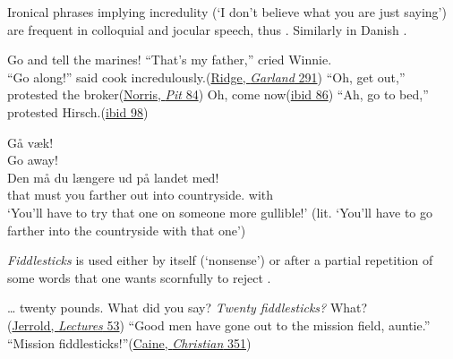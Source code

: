  \label{sec:ironic-incredulity}

Ironical phrases implying incredulity (`I don't believe what you are just saying') are frequent in colloquial and jocular speech, thus . Similarly in Danish .

\ea \label{ex:04-131}
\ea
Go and tell the marines!
\ex
``That's my father,'' cried Winnie.\\``Go along!'' said cook incredulously.\hfill(\href{https://babel.hathitrust.org/cgi/pt?id=nyp.33433081588182&seq=304&q1=said+cook+incredulously}{Ridge, \textit{Garland} 291}) %
\ex
``Oh, get out,'' protested the broker\hfill(\href{https://archive.org/details/pitepicofwheatde00norruoft/page/68/mode/2up?view=theater&q=\%22protested+the+broker%22}{Norris, \textit{Pit} 84}) %
\ex
Oh, come now\hfill(\href{https://archive.org/details/pitepicofwheatde00norruoft/page/68/mode/2up?q=\%22Oh%2C+come+now%22}{ibid 86})
\ex
``Ah, go to bed,'' protested Hirsch.\hfill(\href{https://archive.org/details/pitepicofwheatde00norruoft/page/78/mode/2up?q=\%22Ah%2C+go+to+bed%22}{ibid 98}) %
\z
\z

\ea \label{ex:04-136}
\ea
\gll Gå væk!\\
 Go away!\\

\ex
\gll Den må du længere ud på landet med!\\
that must you farther out into countryside.\DEF{} with\\
\glt `You'll have to try that one on someone more gullible!' (lit. `You'll have to go farther into the countryside with that one')
\z
\z

\textit{Fiddlesticks} is used either by itself (`nonsense') or after a partial repetition of some words that one wants scornfully to reject .

\ea \label{ex:04-138}
\ea
{\dots} twenty pounds. What did you say? \textit{Twenty fiddlesticks?} What?\\\hfill(\href{https://archive.org/details/mrscaudlescurtai00jerruoft/page/70/mode/2up?q=\%22Twenty+fiddlesticks\%22&view=theater}{Jerrold, \textit{Lectures} 53}) %
\ex
``Good men have gone out to the mission field, auntie.''\\``Mission fiddlesticks!''\hfill(\href{https://archive.org/details/christianstory00cainrich/page/418/mode/2up?q=\%22fiddlesticks%22}{Caine, \textit{Christian} 351})
\z %
\z

